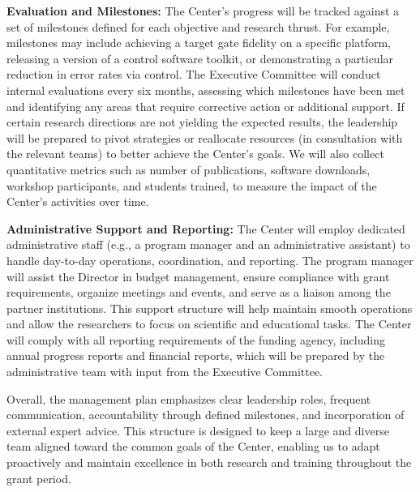 \documentclass[11pt]{article}
\begin{document}
\textbf{Evaluation and Milestones:} The Center’s progress will be tracked against a set of milestones defined for each objective and research thrust. For example, milestones may include achieving a target gate fidelity on a specific platform, releasing a version of a control software toolkit, or demonstrating a particular reduction in error rates via control. The Executive Committee will conduct internal evaluations every six months, assessing which milestones have been met and identifying any areas that require corrective action or additional support. If certain research directions are not yielding the expected results, the leadership will be prepared to pivot strategies or reallocate resources (in consultation with the relevant teams) to better achieve the Center's goals. We will also collect quantitative metrics such as number of publications, software downloads, workshop participants, and students trained, to measure the impact of the Center’s activities over time.

\textbf{Administrative Support and Reporting:} The Center will employ dedicated administrative staff (e.g., a program manager and an administrative assistant) to handle day-to-day operations, coordination, and reporting. The program manager will assist the Director in budget management, ensure compliance with grant requirements, organize meetings and events, and serve as a liaison among the partner institutions. This support structure will help maintain smooth operations and allow the researchers to focus on scientific and educational tasks. The Center will comply with all reporting requirements of the funding agency, including annual progress reports and financial reports, which will be prepared by the administrative team with input from the Executive Committee.

Overall, the management plan emphasizes clear leadership roles, frequent communication, accountability through defined milestones, and incorporation of external expert advice. This structure is designed to keep a large and diverse team aligned toward the common goals of the Center, enabling us to adapt proactively and maintain excellence in both research and training throughout the grant period.
\end{document}
